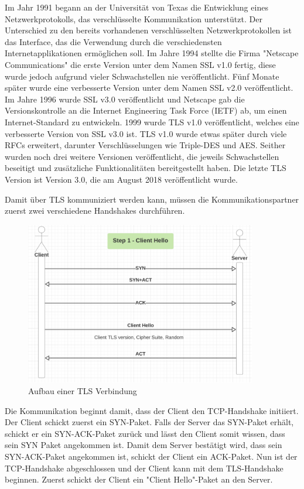 Im Jahr 1991 begann an der Universität von Texas die Entwicklung eines Netzwerkprotokolls, das verschlüsselte Kommunikation unterstützt. Der Unterschied zu den bereits vorhandenen verschlüsselten Netzwerkprotokollen ist das Interface, das die Verwendung durch die verschiedensten Internetapplikationen ermöglichen soll. Im Jahre 1994 stellte die Firma "Netscape Communications" die erste Version unter dem Namen SSL v1.0 fertig, diese wurde jedoch aufgrund vieler Schwachstellen nie veröffentlicht. Fünf Monate später wurde eine verbesserte Version unter dem Namen SSL v2.0 veröffentlicht. Im Jahre 1996 wurde SSL v3.0 veröffentlicht und Netscape gab die Versionskontrolle an die Internet Engineering Task Force (IETF) ab, um einen Internet-Standard zu entwickeln. 1999 wurde TLS v1.0 veröffentlicht, welches eine verbesserte Version von SSL v3.0 ist. TLS v1.0 wurde etwas später durch viele RFCs erweitert, darunter Verschlüsselungen wie Triple-DES und AES. Seither wurden noch drei weitere Versionen veröffentlicht, die jeweils Schwachstellen beseitigt und zusätzliche Funktionalitäten bereitgestellt haben. Die letzte TLS Version ist Version 3.0, die am August 2018 veröffentlicht wurde. \cite{WikiTLS} 

Damit über TLS kommuniziert werden kann, müssen die Kommunikationspartner zuerst zwei verschiedene Handshakes durchführen. 

\begin{figure}[H]
    \centering
    \includegraphics[width=0.9\textwidth]{media/OpenSSL/VerbindungsAufbau.png}
    \caption{Aufbau einer TLS Verbindung \cite{DeepDiveTLS}}
\end{figure}

Die Kommunikation beginnt damit, dass der Client den TCP-Handshake initiiert. Der Client schickt zuerst ein SYN-Paket. Falls der Server das SYN-Paket erhält, schickt er ein SYN-ACK-Paket zurück und lässt den Client somit wissen, dass sein SYN Paket angekommen ist. Damit dem Server bestätigt wird, dass sein SYN-ACK-Paket angekommen ist, schickt der Client ein ACK-Paket. Nun ist der TCP-Handshake abgeschlossen und der Client kann mit dem TLS-Handshake beginnen. Zuerst schickt der Client ein "Client Hello"-Paket an den Server.

